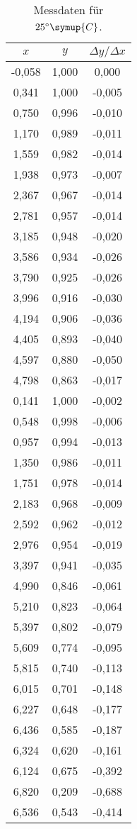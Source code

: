 \begin{longtable}{c c c}
	\caption{Messdaten für $25^\circ \symup{C}$.}
	\label{tab:25}\\
	\hline
	$x$ & $y$  & $\Delta y / \Delta x$ \\
	\hline
	-0,058&1,000&0,000 \\
	0,341&1,000&-0,005 \\
	0,750&0,996&-0,010 \\
	1,170&0,989&-0,011 \\
	1,559&0,982&-0,014 \\
	1,938&0,973&-0,007 \\
	2,367&0,967&-0,014 \\
	2,781&0,957&-0,014 \\
	3,185&0,948&-0,020 \\
	3,586&0,934&-0,026 \\
	3,790&0,925&-0,026 \\
	3,996&0,916&-0,030 \\
	4,194&0,906&-0,036 \\
	4,405&0,893&-0,040 \\
	4,597&0,880&-0,050 \\
	4,798&0,863&-0,017 \\
	0,141&1,000&-0,002 \\
	0,548&0,998&-0,006 \\
	0,957&0,994&-0,013 \\
	1,350&0,986&-0,011 \\
	1,751&0,978&-0,014 \\
	2,183&0,968&-0,009 \\
	2,592&0,962&-0,012 \\
	2,976&0,954&-0,019 \\
	3,397&0,941&-0,035 \\
	4,990&0,846&-0,061 \\
	5,210&0,823&-0,064 \\
	5,397&0,802&-0,079 \\
	5,609&0,774&-0,095 \\
	5,815&0,740&-0,113 \\
	6,015&0,701&-0,148 \\
	6,227&0,648&-0,177 \\
	6,436&0,585&-0,187 \\
	6,324&0,620&-0,161 \\
	6,124&0,675&-0,392 \\
	6,820&0,209&-0,688 \\
	6,536&0,543&-0,414 \\

\end{longtable}
